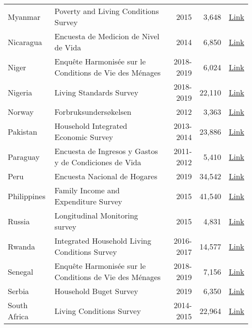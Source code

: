 \begin{ThreePartTable}
\begin{longtable}[t]{l|p{8cm}|r|r|c}
        Myanmar & Poverty and Living Conditions Survey & 2015 &  3,648  & \href{http://hdl.handle.net/10986/29037}{Link} \\ 
        Nicaragua & Encuesta de Medicion de Nivel de Vida & 2014 &  6,850  & \href{https://www.inide.gob.ni/Home/enmv}{Link} \\ 
        Niger & Enquête Harmonisée sur le Conditions de Vie des Ménages & 2018-2019 &  6,024  & \href{https://microdata.worldbank.org/index.php/catalog/4296}{Link} \\ 
        Nigeria & Living Standards Survey & 2018-2019 &  22,110  & \href{https://microdata.worldbank.org/index.php/catalog/5835}{Link} \\ 
        Norway & Forbruksundersøkelsen & 2012 &  3,363  & \href{https://www.ssb.no/inntekt-og-forbruk/artikler-og-publikasjoner/forbruksundersokelsen-2012}{Link} \\ 
        Pakistan & Household Integrated Economic Survey & 2013-2014 &  23,886  & \href{https://www.pbs.gov.pk/publication/household-integrated-economic-survey-hies-2018-19}{Link} \\ 
        Paraguay & Encuesta de Ingresos y Gastos y de Condiciones de Vida & 2011-2012 &  5,410  & \href{https://www.ine.gov.py/microdatos/microdatos.php}{Link} \\ 
        Peru & Encuesta Nacional de Hogares & 2019 &  34,542  & \href{https://www.datosabiertos.gob.pe/dataset/encuesta-nacional-de-hogares-enaho-2019-instituto-nacional-de-estad\%C3\%ADstica-e-inform\%C3\%A1tica-inei}{Link} \\ 
        Philippines & Family Income and Expenditure Survey & 2015 &  41,540  & \href{https://rssoncr.psa.gov.ph/fies}{Link} \\ 
        Russia & Longitudinal Monitoring survey & 2015 &  4,831  & \href{https://www.hse.ru/en/rlms/availability }{Link} \\ 
        Rwanda & Integrated Household Living Conditions Survey & 2016-2017 &  14,577  & \href{https://www.statistics.gov.rw/datasource/integrated-household-living-conditions-survey-eicv}{Link} \\ 
        Senegal & Enquête Harmonisée sur le Conditions de Vie des Ménages & 2018-2019 &  7,156  & \href{https://microdata.worldbank.org/index.php/catalog/4297}{Link} \\ 
        Serbia & Household Buget Survey & 2019 &  6,350  & \href{https://data.stat.gov.rs/?caller=0101\&languageCode=en-US}{Link} \\ 
        South Africa & Living Conditions Survey & 2014-2015 &  22,964  & \href{https://microdata.worldbank.org/index.php/catalog/2882}{Link} \\ 

\end{longtable}
\end{ThreePartTable}
